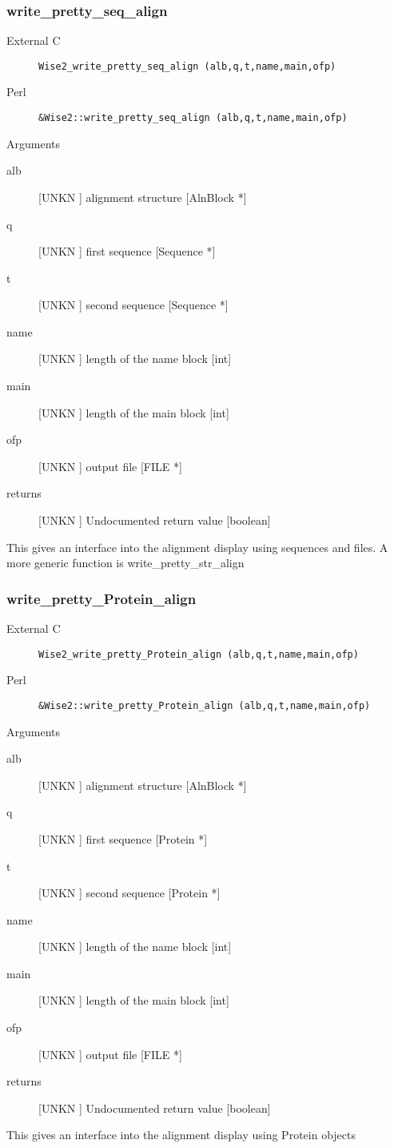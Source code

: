 \subsubsection{write_pretty_seq_align}
\begin{description}
\item[External C] {\tt Wise2_write_pretty_seq_align (alb,q,t,name,main,ofp)}
\item[Perl] {\tt &Wise2::write_pretty_seq_align (alb,q,t,name,main,ofp)}

\end{description}
Arguments
\begin{description}
\item[alb] [UNKN ] alignment structure [AlnBlock *]
\item[q] [UNKN ] first sequence [Sequence *]
\item[t] [UNKN ] second sequence  [Sequence *]
\item[name] [UNKN ] length of the name block [int]
\item[main] [UNKN ] length of the main block [int]
\item[ofp] [UNKN ] output file [FILE *]
\item[returns] [UNKN ] Undocumented return value [boolean]
\end{description}
This gives an interface into the alignment
display using sequences and files. A more
generic function is write_pretty_str_align


\subsubsection{write_pretty_Protein_align}
\begin{description}
\item[External C] {\tt Wise2_write_pretty_Protein_align (alb,q,t,name,main,ofp)}
\item[Perl] {\tt &Wise2::write_pretty_Protein_align (alb,q,t,name,main,ofp)}

\end{description}
Arguments
\begin{description}
\item[alb] [UNKN ] alignment structure [AlnBlock *]
\item[q] [UNKN ] first sequence [Protein *]
\item[t] [UNKN ] second sequence  [Protein *]
\item[name] [UNKN ] length of the name block [int]
\item[main] [UNKN ] length of the main block [int]
\item[ofp] [UNKN ] output file [FILE *]
\item[returns] [UNKN ] Undocumented return value [boolean]
\end{description}
This gives an interface into the
alignment display using Protein
objects




